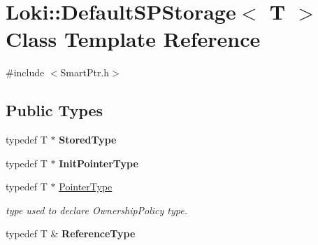 \hypertarget{classLoki_1_1DefaultSPStorage}{}\section{Loki\+:\+:Default\+S\+P\+Storage$<$ T $>$ Class Template Reference}
\label{classLoki_1_1DefaultSPStorage}


{\ttfamily \#include $<$Smart\+Ptr.\+h$>$}

\subsection*{Public Types}
\begin{DoxyCompactItemize}
\item 
\hypertarget{classLoki_1_1DefaultSPStorage_ae0817bcabf476417a814c0950da7e93a}{}typedef T $\ast$ {\bfseries Stored\+Type}\label{classLoki_1_1DefaultSPStorage_ae0817bcabf476417a814c0950da7e93a}

\item 
\hypertarget{classLoki_1_1DefaultSPStorage_aa9f6019ae6df76271116540277aeeb37}{}typedef T $\ast$ {\bfseries Init\+Pointer\+Type}\label{classLoki_1_1DefaultSPStorage_aa9f6019ae6df76271116540277aeeb37}

\item 
\hypertarget{classLoki_1_1DefaultSPStorage_a70074a5e2fe5b95668d4e5bb0f0909a8}{}typedef T $\ast$ \hyperlink{classLoki_1_1DefaultSPStorage_a70074a5e2fe5b95668d4e5bb0f0909a8}{Pointer\+Type}\label{classLoki_1_1DefaultSPStorage_a70074a5e2fe5b95668d4e5bb0f0909a8}

\begin{DoxyCompactList}\small\item\em type used to declare Ownership\+Policy type. \end{DoxyCompactList}\item 
\hypertarget{classLoki_1_1DefaultSPStorage_a58d21a0d2250d1036df4c58f2b849676}{}typedef T \& {\bfseries Reference\+Type}\label{classLoki_1_1DefaultSPStorage_a58d21a0d2250d1036df4c58f2b849676}

\end{DoxyCompactItemize}

